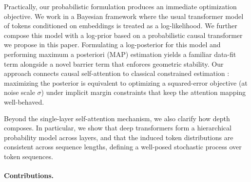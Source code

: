 \documentclass[11pt]{article}
\begin{document}
Practically, our probabilistic formulation produces an immediate optimization objective. We work in a Bayesian framework \citep{Bishop06,Murphy12} where the usual transformer model of tokens conditioned on embeddings is treated as a log-likelihood. We further compose this model with a log-prior based on a probabilistic causal transformer we propose in this paper. Formulating a log-posterior for this model and performing maximum a posteriori (MAP) estimation yields a familiar data-fit term alongside a novel barrier term that enforces geometric stability. Our approach connects causal self-attention to classical constrained estimation \citep{BoydVa04}: maximizing the posterior is equivalent to optimizing a squared-error objective (at noise scale $\sigma$) under implicit margin constraints that keep the attention mapping well-behaved.

Beyond the single-layer self-attention mechanism, we also clarify how depth composes. In particular, we show that deep transformers form a hierarchical probability model across layers, and that the induced token distributions are consistent across sequence lengths, defining a well-posed stochastic process over token sequences.

\paragraph{Contributions.}
\end{document}
